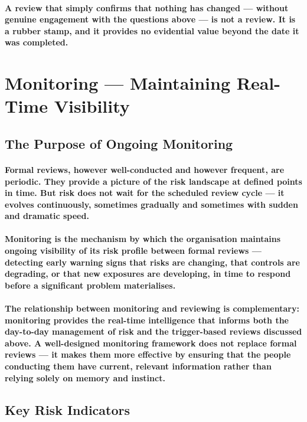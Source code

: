 \paragraph{A review that simply confirms that nothing has changed — without genuine engagement with the questions above — is not a review. It is a rubber stamp, and it provides no evidential value beyond the date it was completed.}

\section{Monitoring — Maintaining Real-Time Visibility}
\subsection{The Purpose of Ongoing Monitoring}
\paragraph{Formal reviews, however well-conducted and however frequent, are periodic. They provide a picture of the risk landscape at defined points in time. But risk does not wait for the scheduled review cycle — it evolves continuously, sometimes gradually and sometimes with sudden and dramatic speed.}
\paragraph{\textbf{Monitoring} is the mechanism by which the organisation maintains ongoing visibility of its risk profile between formal reviews — detecting early warning signs that risks are changing, that controls are degrading, or that new exposures are developing, in time to respond before a significant problem materialises.}
\paragraph{The relationship between monitoring and reviewing is complementary: monitoring provides the real-time intelligence that informs both the day-to-day management of risk and the trigger-based reviews discussed above. A well-designed monitoring framework does not replace formal reviews — it makes them more effective by ensuring that the people conducting them have current, relevant information rather than relying solely on memory and instinct.}

\subsection{Key Risk Indicators}
